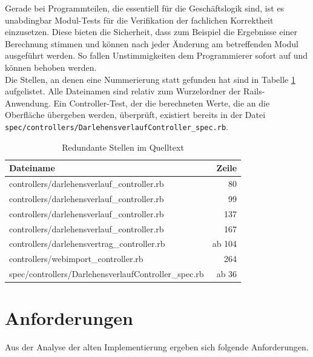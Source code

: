 \documentclass[12pt]{scrreprt}
\begin{document}
Gerade bei Programmteilen, die essentiell für die Geschäftslogik sind, ist es unabdingbar Modul-Tests für die Verifikation der fachlichen Korrektheit einzusetzen. Diese bieten die Sicherheit, dass zum Beispiel die Ergebnisse einer Berechnung stimmen und können nach jeder Änderung am betreffenden Modul ausgeführt werden. So fallen Unstimmigkeiten dem Programmierer sofort auf und können behoben werden. \\ 

Die Stellen, an denen eine Nummerierung statt gefunden hat sind in Tabelle \ref{redundant} aufgelistet. Alle Dateinamen sind relativ zum Wurzelordner der Rails-Anwendung. Ein Controller-Test, der die berechneten Werte, die an die Oberfläche übergeben werden, überprüft, existiert bereits in der Datei 
\newline \verb+spec/controllers/DarlehensverlaufController_spec.rb+.

\begin{table}
  \begin{center}
    \begin{tabular}{|l|r|}
      \hline
      \textbf{Dateiname} & \textbf{Zeile}\\
      \hline
      controllers/darlehensverlauf\_controller.rb & 80\\
      \hline
      controllers/darlehensverlauf\_controller.rb & 99\\
      \hline
      controllers/darlehensverlauf\_controller.rb & 137\\
      \hline
      controllers/darlehensverlauf\_controller.rb & 167\\
      \hline
      controllers/darlehensvertrag\_controller.rb & ab 104\\
      \hline
      controllers/webimport\_controller.rb & 264\\
      \hline
      spec/controllers/DarlehensverlaufController\_spec.rb & ab 36\\
      \hline
    \end{tabular}
    \caption{Redundante Stellen im Quelltext}
    \label{redundant}
  \end{center}
\end{table}
\vspace{2mm}

\section{Anforderungen}
Aus der Analyse der alten Implementierung ergeben sich folgende Anforderungen.
\end{document}
